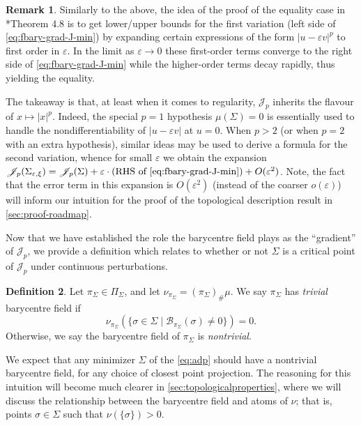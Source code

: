 \documentclass[preprint, reqno]{amsart}
\renewcommand{\epsilon}{\varepsilon}
\theoremstyle{definition}
\newtheorem{definition}{Definition}[section]
\newtheorem{remark}[definition]{Remark}
\numberwithin{equation}{section}
\begin{document}
\begin{remark} \label{rem:error-estimates} Similarly to the above, the
  idea of the proof of the equality case in
  \cite{Kobayashi24}*{Theorem 4.8} is to get lower/upper bounds for
  the first variation (left side of \eqref{eq:fbary-grad-J-min}) by
  expanding certain expressions of the form $|u - \epsilon v|^p$ to
  first order in $\epsilon$. In the limit as $\epsilon \to 0$ these
  first-order terms converge to the right side of
  \eqref{eq:fbary-grad-J-min} while the higher-order terms decay
  rapidly, thus yielding the equality.

  The takeaway is that, at least when it comes to regularity,
  $\mathscr J_p$ inherits the flavour of $x \mapsto |x|^p$. Indeed,
  the special $p=1$ hypothesis $\mu(\Sigma) = 0$ is
  essentially used to handle the nondifferentiability of $|u -
  \epsilon v|$ at $u=0$. When $p > 2$ (or when $p=2$ with an extra
  hypothesis), similar ideas may be used to derive a formula for the
  second variation, whence for small $\epsilon$ we obtain the
  expansion $\mathscr J_p(\Sigma_{\epsilon, \xi}) =
  \mathscr{J}_p(\Sigma) + \epsilon \cdot (\text{RHS of
    \eqref{eq:fbary-grad-J-min}}) + O(\epsilon^2)$. Note, the fact
  that the error term in this expansion is $O(\epsilon^2)$ (instead of
  the coarser $o(\epsilon)$) will inform our intuition for the proof
  of the topological description result in \cref{sec:proof-roadmap}.
\end{remark}


Now that we have established the role the barycentre field plays as
the ``gradient'' of $\mathscr{J}_p$, we provide a definition which
relates to whether or not $\Sigma$ is a critical point of
$\mathscr{J}_p$ under continuous perturbations.
\begin{definition}\label{def:trivialbarycentrefield}
  Let $\pi_{\Sigma} \in \Pi_{\Sigma}$, and let $\nu_{\pi_{\Sigma}}=
  (\pi_{\Sigma})_{\#}\mu$. We say $\pi_{\Sigma}$ has \textit{trivial}
  barycentre field if
  \[
    \nu_{\pi_{\Sigma}}(\{\sigma \in \Sigma \mid
    \mathcal{B}_{\pi_{\Sigma}}(\sigma) \ne 0\}) = 0.
  \]
  Otherwise, we say the barycentre field of $\pi_{\Sigma}$ is
  \textit{nontrivial}.
\end{definition}
We expect that any minimizer $\Sigma$ of the \eqref{eq:adp} should
have a nontrivial barycentre field, for any choice of closest point
projection. The reasoning for this intuition will become much clearer
in \cref{sec:topologicalproperties}, where we will discuss the
relationship between the barycentre field and atoms of $\nu$; that is,
points $\sigma \in \Sigma$ such that $\nu(\{\sigma\}) > 0$.
\end{document}
